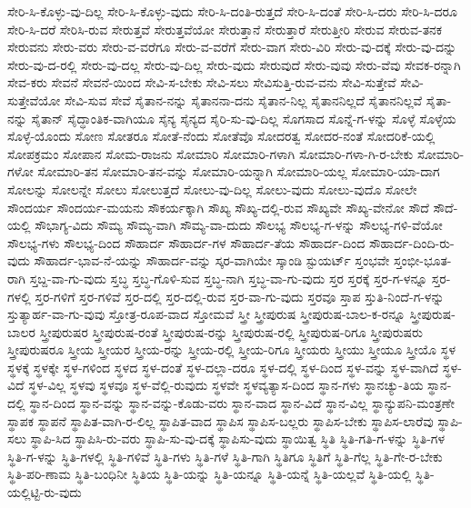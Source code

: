 {ಸೇರಿ-ಸಿ-ಕೊಳ್ಳು-ವು-ದಿಲ್ಲ
ಸೇರಿ-ಸಿ-ಕೊಳ್ಳು-ವುದು
ಸೇರಿ-ಸಿ-ದಂತಿ-ರುತ್ತದೆ
ಸೇರಿ-ಸಿ-ದಂತೆ
ಸೇರಿ-ಸಿ-ದರು
ಸೇರಿ-ಸಿ-ದರೂ
ಸೇರಿ-ಸಿ-ದರೆ
ಸೇರಿಸಿ-ರುವ
ಸೇರುತ್ತವೆ
ಸೇರುತ್ತವೆಯೋ
ಸೇರುತ್ತಾನೆ
ಸೇರುತ್ತಾರೆ
ಸೇರುತ್ತೀರಿ
ಸೇರುವ
ಸೇರುವ-ತನಕ
ಸೇರುವನು
ಸೇರು-ವರು
ಸೇರು-ವ-ವರೆಗೂ
ಸೇರು-ವ-ವರೆಗೆ
ಸೇರು-ವಾಗ
ಸೇರು-ವಿರಿ
ಸೇರು-ವು-ದಕ್ಕೆ
ಸೇರು-ವು-ದನ್ನು
ಸೇರು-ವು-ದ-ರಲ್ಲಿ
ಸೇರು-ವು-ದಲ್ಲ
ಸೇರು-ವು-ದಿಲ್ಲ
ಸೇರು-ವುದು
ಸೇರುವುದೆ
ಸೇರು-ವುವು
ಸೇರು-ವೆವು
ಸೇವಕ-ರನ್ನಾಗಿ
ಸೇವ-ಕರು
ಸೇವನೆ
ಸೇವನೆ-ಯಿಂದ
ಸೇವಿ-ಸ-ಬೇಕು
ಸೇವಿ-ಸಲು
ಸೇವಿಸುತ್ತಿ-ರುವ-ವನು
ಸೇವಿ-ಸುತ್ತೇವೆ
ಸೇವಿ-ಸುತ್ತೇವೆಯೋ
ಸೇವಿ-ಸುವ
ಸೇವೆ
ಸೈತಾನ-ನನ್ನು
ಸೈತಾನನಾ-ದನು
ಸೈತಾನ-ನಿಲ್ಲ
ಸೈತಾನನಿಲ್ಲದೆ
ಸೈತಾನನಿಲ್ಲವೆ
ಸೈತಾ-ನನ್ನು
ಸೈತಾನ್
ಸೈದ್ಧಾಂತಿಕ-ವಾಗಿಯೂ
ಸೈನ್ಯ
ಸೈನ್ಯದ
ಸೈರಿ-ಸು-ವು-ದಿಲ್ಲ
ಸೊಗಸಾದ
ಸೊನ್ನೆ-ಗ-ಳನ್ನು
ಸೊಳ್ಳೆ
ಸೊಳ್ಳೆಯ
ಸೊಳ್ಳೆ-ಯೊಂದು
ಸೋಣ
ಸೋತರೂ
ಸೋತೆ-ನೆಂದು
ಸೋತೆವೊ
ಸೋದರತ್ವ
ಸೋದರ-ನಂತೆ
ಸೋದರಿಕೆ-ಯಲ್ಲಿ
ಸೋಪಕ್ರಮಂ
ಸೋಪಾನ
ಸೋಮ-ರಾಜನು
ಸೋಮಾರಿ
ಸೋಮಾರಿ-ಗಳಾಗಿ
ಸೋಮಾರಿ-ಗಳಾ-ಗಿ-ರ-ಬೇಕು
ಸೋಮಾರಿ-ಗಳೋ
ಸೋಮಾರಿ-ತನ
ಸೋಮಾರಿ-ತನ-ವನ್ನು
ಸೋಮಾರಿ-ಯನ್ನಾಗಿ
ಸೋಮಾರಿ-ಯಲ್ಲ
ಸೋಮಾರಿ-ಯಾ-ದಾಗ
ಸೋಲನ್ನು
ಸೋಲನ್ನೇ
ಸೋಲು
ಸೋಲುತ್ತದೆ
ಸೋಲು-ವು-ದಿಲ್ಲ
ಸೋಲು-ವುದು
ಸೋಲು-ವುದೊ
ಸೋಲೇ
ಸೌಂದರ್ಯ
ಸೌಂದರ್ಯ-ಮಯನು
ಸೌಕರ್ಯಕ್ಕಾಗಿ
ಸೌಖ್ಯ
ಸೌಖ್ಯ-ದಲ್ಲಿ-ರುವ
ಸೌಖ್ಯವೇ
ಸೌಖ್ಯ-ವೇನೋ
ಸೌದೆ
ಸೌದೆ-ಯಲ್ಲಿ
ಸೌಭಾಗ್ಯ-ವಿದು
ಸೌಮ್ಯ
ಸೌಮ್ಯ-ವಾಗಿ
ಸೌಮ್ಯ-ವಾ-ದುದು
ಸೌಲಭ್ಯ
ಸೌಲಭ್ಯ-ಗ-ಳನ್ನು
ಸೌಲಭ್ಯ-ಗಳಿ-ವೆಯೋ
ಸೌಲಭ್ಯ-ಗಳು
ಸೌಲಭ್ಯ-ದಿಂದ
ಸೌಹಾರ್ದ
ಸೌಹಾರ್ದ-ಗಳ
ಸೌಹಾರ್ದ-ತೆಯ
ಸೌಹಾರ್ದ-ದಿಂದ
ಸೌಹಾರ್ದ-ದಿಂದಿ-ರು-ವುದು
ಸೌಹಾರ್ದ-ಭಾವ-ನೆ-ಯನ್ನು
ಸೌಹಾರ್ದ-ವನ್ನು
ಸ್ಕರ-ವಾಗಿಯೇ
ಸ್ಕಾಂಡಿ
ಸ್ಟುಯರ್ಟ್
ಸ್ತಂಭವೇ
ಸ್ತಂಭೀ-ಭೂತ-ರಾಗಿ
ಸ್ತಬ್ದ-ವಾ-ಗು-ವುದು
ಸ್ತಬ್ಧ
ಸ್ತಬ್ಧ-ಗೊಳಿ-ಸುವ
ಸ್ತಬ್ಧ-ನಾಗಿ
ಸ್ತಬ್ಧ-ವಾ-ಗು-ವುದು
ಸ್ತರ
ಸ್ತರಕ್ಕೆ
ಸ್ತರ-ಗ-ಳನ್ನೂ
ಸ್ತರ-ಗಳಲ್ಲಿ
ಸ್ತರ-ಗಳಿಗೆ
ಸ್ತರ-ಗಳಿವೆ
ಸ್ತರ-ದಲ್ಲಿ
ಸ್ತರ-ದಲ್ಲಿ-ರುವ
ಸ್ತರ-ವಾ-ಗು-ವುದು
ಸ್ತರವೂ
ಸ್ತಾಪ
ಸ್ತುತಿ-ನಿಂದೆ-ಗ-ಳನ್ನು
ಸ್ತುತ್ಯಾರ್ಹ-ವಾ-ಗು-ವುವು
ಸ್ತೋತ್ರ-ರೂಪ-ವಾದ
ಸ್ತೋಮವೆ
ಸ್ತ್ರೀ
ಸ್ತ್ರೀಪುರುಷ
ಸ್ತ್ರೀಪುರುಷ-ಬಾಲ-ಕ-ರನ್ನೂ
ಸ್ತ್ರೀಪುರುಷ-ಬಾಲರ
ಸ್ತ್ರೀಪುರುಷರ
ಸ್ತ್ರೀಪುರುಷ-ರಂತೆ
ಸ್ತ್ರೀಪುರುಷ-ರನ್ನು
ಸ್ತ್ರೀಪುರುಷ-ರಲ್ಲಿ
ಸ್ತ್ರೀಪುರುಷ-ರಿಗೂ
ಸ್ತ್ರೀಪುರುಷರು
ಸ್ತ್ರೀಪುರುಷರೂ
ಸ್ತ್ರೀಯ
ಸ್ತ್ರೀಯರ
ಸ್ತ್ರೀಯ-ರನ್ನು
ಸ್ತ್ರೀಯ-ರಲ್ಲಿ
ಸ್ತ್ರೀಯ-ರಿಗೂ
ಸ್ತ್ರೀಯರು
ಸ್ತ್ರೀಯು
ಸ್ತ್ರೀಯೂ
ಸ್ತ್ರೀಯೊ
ಸ್ಥಳ
ಸ್ಥಳಕ್ಕೆ
ಸ್ಥಳಕ್ಕೇ
ಸ್ಥಳ-ಗಳಿಂದ
ಸ್ಥಳದ
ಸ್ಥಳ-ದಂತೆ
ಸ್ಥಳ-ದಲ್ಲಾ-ದರೂ
ಸ್ಥಳ-ದಲ್ಲಿ
ಸ್ಥಳ-ದಿಂದ
ಸ್ಥಳ-ವನ್ನು
ಸ್ಥಳ-ವಾಗಿದೆ
ಸ್ಥಳ-ವಿದೆ
ಸ್ಥಳ-ವಿಲ್ಲ
ಸ್ಥಳವು
ಸ್ಥಳವೂ
ಸ್ಥಳ-ವೆಲ್ಲಿ-ರುವುದು
ಸ್ಥಳವೇ
ಸ್ಥಳವ್ಯತ್ಯಾಸ-ದಿಂದ
ಸ್ಥಾನ-ಗಳು
ಸ್ಥಾನಚ್ಯು-ತಿಯ
ಸ್ಥಾನ-ದಲ್ಲಿ
ಸ್ಥಾನ-ದಿಂದ
ಸ್ಥಾನ-ವನ್ನು
ಸ್ಥಾನ-ವನ್ನು-ಕೊಡು-ವರು
ಸ್ಥಾನ-ವಾದ
ಸ್ಥಾನ-ವಿದೆ
ಸ್ಥಾನ-ವಿಲ್ಲ
ಸ್ಥಾನ್ಯುಪನಿ-ಮಂತ್ರಣೇ
ಸ್ಥಾಪಕ
ಸ್ಥಾಪನೆ
ಸ್ಥಾಪಿತ-ವಾಗಿ-ರ-ಲಿಲ್ಲ
ಸ್ಥಾಪಿತ-ವಾದ
ಸ್ಥಾಪಿಸ
ಸ್ಥಾಪಿಸ-ಬಲ್ಲರು
ಸ್ಥಾಪಿಸ-ಬೇಕು
ಸ್ಥಾಪಿಸ-ಲಾರೆವು
ಸ್ಥಾಪಿ-ಸಲು
ಸ್ಥಾಪಿ-ಸಿದ
ಸ್ಥಾಪಿಸಿ-ರು-ವರು
ಸ್ಥಾಪಿ-ಸು-ವು-ದಕ್ಕೆ
ಸ್ಥಾಪಿಸು-ವುದು
ಸ್ಥಾಯಿತ್ವ
ಸ್ಥಿತಿ
ಸ್ಥಿತಿ-ಗತಿ-ಗ-ಳನ್ನು
ಸ್ಥಿತಿ-ಗಳ
ಸ್ಥಿತಿ-ಗ-ಳನ್ನು
ಸ್ಥಿತಿ-ಗಳಲ್ಲಿ
ಸ್ಥಿತಿ-ಗಳಿವೆ
ಸ್ಥಿತಿ-ಗಳು
ಸ್ಥಿತಿ-ಗಳೆ
ಸ್ಥಿತಿ-ಗಾಗಿ
ಸ್ಥಿತಿಗೂ
ಸ್ಥಿತಿಗೆ
ಸ್ಥಿತಿ-ಗೆಲ್ಲ
ಸ್ಥಿತಿ-ಗೇ-ರ-ಬೇಕು
ಸ್ಥಿತಿ-ಪರಿ-ಣಾಮ
ಸ್ಥಿತಿ-ಬಂಧಿನೀ
ಸ್ಥಿತಿಯ
ಸ್ಥಿತಿ-ಯನ್ನು
ಸ್ಥಿತಿ-ಯನ್ನೂ
ಸ್ಥಿತಿ-ಯನ್ನೆ
ಸ್ಥಿತಿ-ಯಲ್ಲವೆ
ಸ್ಥಿತಿ-ಯಲ್ಲಿ
ಸ್ಥಿತಿ-ಯಲ್ಲಿಟ್ಟಿ-ರು-ವುದು
}
